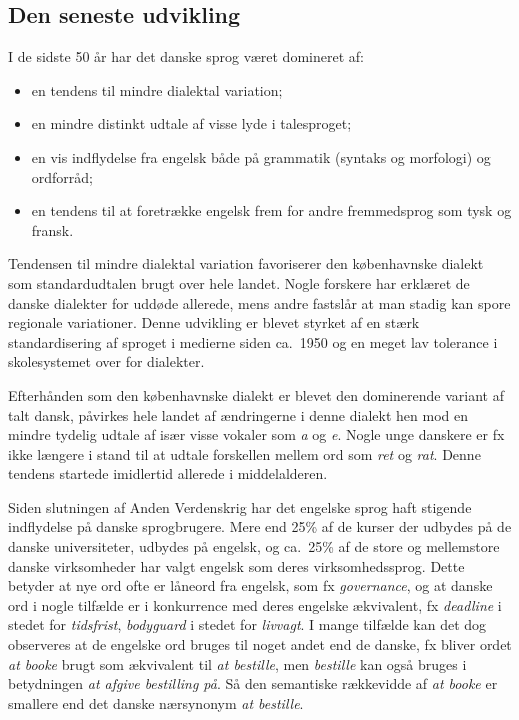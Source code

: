 \begin{multicols}{2}

\subsection{Den seneste udvikling}

 I de sidste 50 \aa r har det danske sprog v\ae ret domineret af:
\begin{itemize}
\item 	en tendens til mindre dialektal variation;
\item	en mindre distinkt udtale af visse lyde i talesproget;
\item	en vis indflydelse fra engelsk b\aa de \mbox{p\aa} grammatik (syntaks og morfologi) og ordforr\aa d;
\item	en tendens til at foretr\ae kke engelsk frem for andre fremmedsprog som tysk og fransk.
\end{itemize}
Tendensen til mindre dialektal variation favoriserer den k\o benhavnske dialekt som standardudtalen brugt over hele landet. Nogle forskere har erkl\ae ret de danske dialekter for udd\o de allerede, mens andre fastsl\aa r at man stadig kan spore regionale variationer. Denne udvikling er blevet styrket af en st\ae rk standardisering af sproget i medierne siden ca.\ 1950 og en meget lav tolerance i skolesystemet over for dialekter. 

Efterh\aa nden som den k\o benhavnske dialekt er blevet den dominerende variant af talt dansk, p\aa virkes hele landet af \ae ndringerne i denne dialekt hen mod en mindre tydelig udtale af is\ae r visse vokaler som {\it a} og {\it e}. Nogle unge danskere er fx ikke l\ae ngere i stand til at udtale forskellen mellem ord som {\it ret} og {\it rat}. Denne tendens startede imidlertid allerede i middelalderen.

Siden slutningen af Anden Verdenskrig har det engelske sprog haft stigende indflydelse \mbox{p\aa} danske sprogbrugere. Mere end 25\% af de kurser der udbydes \mbox{p\aa} de danske universiteter, udbydes \mbox{p\aa} engelsk, og ca.\ 25\% af de store og mellemstore danske virksomheder har valgt engelsk som deres virksomhedssprog. Dette betyder at nye ord ofte er l\aa neord fra engelsk, som fx {\it governance}, og at danske ord i nogle tilf\ae lde er i konkurrence med deres engelske \ae kvivalent, fx {\it deadline} i stedet for {\it tidsfrist}, {\it bodyguard} i stedet for {\it livvagt}. I mange tilf\ae lde kan det dog observeres at de engelske ord bruges til noget andet end de danske, fx bliver ordet {\it at booke} brugt som \ae kvivalent til {\it at bestille}, men {\it bestille} kan \mbox{ogs\aa} bruges i betydningen {\it at afgive bestilling \mbox{p\aa}}. \mbox{S\aa} den semantiske r\ae kkevidde af {\it at booke} er smallere end det danske n\ae rsynonym {\it at bestille}.


\end{multicols}
